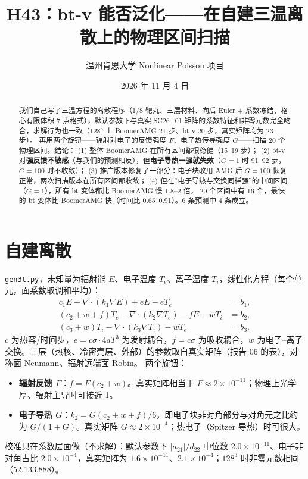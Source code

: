 \documentclass[11pt,a4paper]{ctexart}
\title{H43：bt-v 能否泛化——在自建三温离散上的物理区间扫描}
\author{温州肯恩大学 \quad Nonlinear Poisson 项目}
\date{2026 年 11 月 4 日}
\begin{document}
\maketitle

\begin{abstract}
我们自己写了三温方程的离散程序（1/8 靶丸、三层材料、向后 Euler + 系数冻结、格心有限体积 7 点格式），默认参数下与真实 SC26\_01 矩阵的系数特征和非零元数完全吻合，求解行为也一致（$128^3$ 上 BoomerAMG 21 步、bt-v 20 步，真实矩阵均为 23 步）。
再用两个旋钮——辐射对电子的反馈强度 $F$、电子热传导强度 $G$——扫描 20 个物理区间。结论：
(1) 整体 BoomerAMG 在所有区间都很稳健（15--19 步）；
(2) bt-v 对\textbf{强反馈不敏感}（与我们的预测相反），但\textbf{电子导热一强就失效}（$G=1$ 时 91--92 步，$G=100$ 时不收敛）；
(3) 推广版本修复了一部分：电子块改用 AMG 后 $G=100$ 恢复正常，两次扫描版本在所有区间都收敛；
(4) 但在“电子导热与交换同样强”的中间区间（$G=1$），所有 bt 变体都比 BoomerAMG 慢 1.8--2 倍。
20 个区间中有 16 个，最快的 bt 变体比 BoomerAMG 快（时间比 0.65--0.91）。6 条预测中 4 条成立。
\end{abstract}

\section{自建离散}
\texttt{gen3t.py}，未知量为辐射能 $E$、电子温度 $T_e$、离子温度 $T_i$，线性化方程（每个单元，面系数取调和平均）：
\begin{align*}
c_1E-\nabla\!\cdot(k_1\nabla E)+eE-eT_e&=b_1,\\
(c_2+w+f)T_e-\nabla\!\cdot(k_2\nabla T_e)-fE-wT_i&=b_2,\\
(c_3+w)T_i-\nabla\!\cdot(k_3\nabla T_i)-wT_e&=b_3 .
\end{align*}
$c$ 为热容/时间步，$e=c\sigma\cdot4aT^3$ 为发射耦合，$f=c\sigma$ 为吸收耦合，$w$ 为电子--离子交换。三层（热核、冷密壳层、外部）的参数取自真实矩阵（报告 06 的表），对称面 Neumann、辐射远端面 Robin。
两个旋钮：
\begin{itemize}
\item \textbf{辐射反馈 $F$}：$f=F(c_2+w)$。真实矩阵相当于 $F\approx2\times10^{-11}$；物理上光学厚、辐射主导时可接近 1。
\item \textbf{电子导热 $G$}：$k_2=G(c_2+w+f)/6$，即电子块非对角部分与对角元之比约为 $G/(1+G)$。真实矩阵 $G\approx2\times10^{-4}$；热电子（Spitzer 导热）时可很大。
\end{itemize}
校准只在系数层面做（不求解）：默认参数下 $|a_{21}|/d_{22}$ 中位数 $2.0\times10^{-11}$、电子非对角占比 $2.0\times10^{-4}$，真实矩阵为 $1.6\times10^{-11}$、$2.1\times10^{-4}$；$128^3$ 时非零元数相同（52,133,888）。
\end{document}

